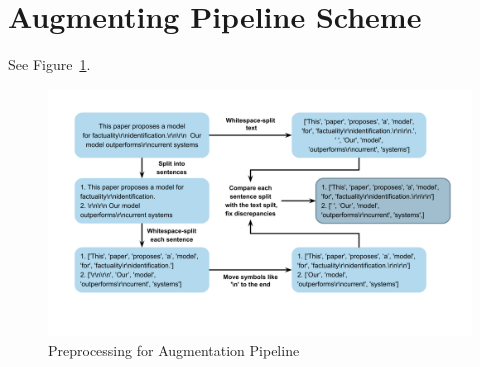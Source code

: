 \documentclass[11pt]{article}
\begin{document}
\section{Augmenting Pipeline Scheme}
See Figure~\ref{fig:example}.
\label{appendix:pipeline}
\begin{figure}[t!]
\centerline{\includegraphics[width=\linewidth]{scheme_final_version.png}}
\caption{Preprocessing for Augmentation Pipeline}
\label{fig:example}
\end{figure}
\end{document}
